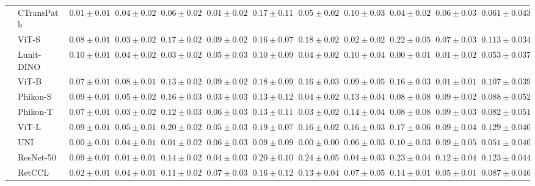 \begin{tabular}{ll|cccc|c|cccc|c}
 & CTransPath~\cite{wang2022transformer} & $0.01 \pm 0.01$ & $0.04 \pm 0.02$ & $0.06 \pm 0.02$ & $\mathbf{0.01 \pm 0.02}$ & $0.17 \pm 0.11$ & $0.05 \pm 0.02$ & $0.10 \pm 0.03$ & $0.04 \pm 0.02$ & $0.06 \pm 0.03$ & $0.061 \pm 0.043$ \\
 & ViT-S~\cite{kolesnikov2021image} & $0.08 \pm 0.01$ & $0.03 \pm 0.02$ & $0.17 \pm 0.02$ & $0.09 \pm 0.02$ & $0.16 \pm 0.07$ & $0.18 \pm 0.02$ & $\mathbf{0.02 \pm 0.02}$ & $0.22 \pm 0.05$ & $0.07 \pm 0.03$ & $0.113 \pm 0.034$ \\
 & Lunit-DINO~\cite{kang2023benchmarking} & $0.10 \pm 0.01$ & $0.04 \pm 0.02$ & $0.03 \pm 0.02$ & $0.05 \pm 0.03$ & $0.10 \pm 0.09$ & $0.04 \pm 0.02$ & $0.10 \pm 0.04$ & $\mathbf{0.00 \pm 0.01}$ & $0.01 \pm 0.02$ & $0.053 \pm 0.037$ \\
 & ViT-B~\cite{kolesnikov2021image} & $0.07 \pm 0.01$ & $0.08 \pm 0.01$ & $0.13 \pm 0.02$ & $0.09 \pm 0.02$ & $0.18 \pm 0.09$ & $0.16 \pm 0.03$ & $0.09 \pm 0.05$ & $0.16 \pm 0.03$ & $\mathbf{0.01 \pm 0.01}$ & $0.107 \pm 0.039$ \\
 & Phikon-S~\cite{filiot2023scaling} & $0.09 \pm 0.01$ & $0.05 \pm 0.02$ & $0.16 \pm 0.03$ & $0.03 \pm 0.03$ & $0.13 \pm 0.12$ & $0.04 \pm 0.02$ & $0.13 \pm 0.04$ & $0.08 \pm 0.08$ & $0.09 \pm 0.02$ & $0.088 \pm 0.052$ \\
 & Phikon-T~\cite{filiot2023scaling} & $0.07 \pm 0.01$ & $0.03 \pm 0.02$ & $0.12 \pm 0.03$ & $0.06 \pm 0.03$ & $0.13 \pm 0.11$ & $0.03 \pm 0.02$ & $0.14 \pm 0.04$ & $0.08 \pm 0.08$ & $0.09 \pm 0.03$ & $0.082 \pm 0.051$ \\
 & ViT-L~\cite{kolesnikov2021image} & $0.09 \pm 0.01$ & $0.05 \pm 0.01$ & $0.20 \pm 0.02$ & $0.05 \pm 0.03$ & $0.19 \pm 0.07$ & $0.16 \pm 0.02$ & $0.16 \pm 0.03$ & $0.17 \pm 0.06$ & $0.09 \pm 0.04$ & $0.129 \pm 0.040$ \\
 & UNI~\cite{chen2024uni} & $\mathbf{0.00 \pm 0.01}$ & $0.04 \pm 0.01$ & $\mathbf{0.01 \pm 0.02}$ & $0.06 \pm 0.03$ & $\mathbf{0.09 \pm 0.09}$ & $\mathbf{0.00 \pm 0.00}$ & $0.06 \pm 0.03$ & $0.10 \pm 0.03$ & $0.09 \pm 0.05$ & $\mathbf{0.051 \pm 0.040}$ \\
 & ResNet-50~\cite{he2015deep} & $0.09 \pm 0.01$ & $\mathbf{0.01 \pm 0.01}$ & $0.14 \pm 0.02$ & $0.04 \pm 0.03$ & $0.20 \pm 0.10$ & $0.24 \pm 0.05$ & $0.04 \pm 0.03$ & $0.23 \pm 0.04$ & $0.12 \pm 0.04$ & $0.123 \pm 0.044$ \\
 & RetCCL~\cite{wang2023retccl} & $0.02 \pm 0.01$ & $0.04 \pm 0.01$ & $0.11 \pm 0.02$ & $0.07 \pm 0.03$ & $0.16 \pm 0.12$ & $0.13 \pm 0.04$ & $0.07 \pm 0.05$ & $0.14 \pm 0.01$ & $0.05 \pm 0.01$ & $0.087 \pm 0.046$ \\

\end{tabular}
